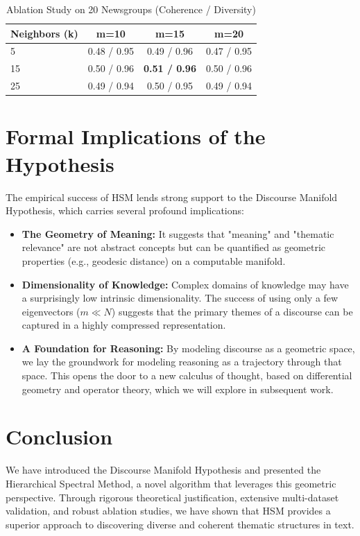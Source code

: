 \documentclass[conference]{IEEEtran}
\begin{document}
\begin{table}[h]
\caption{Ablation Study on 20 Newsgroups (Coherence / Diversity)}
\label{tab:ablation}
\centering
\begin{tabular}{@{}lccc@{}}
\toprule
\textbf{Neighbors (k)} & \textbf{m=10} & \textbf{m=15} & \textbf{m=20} \\ \midrule
5 & 0.48 / 0.95 & 0.49 / 0.96 & 0.47 / 0.95 \\
15 & 0.50 / 0.96 & \textbf{0.51 / 0.96} & 0.50 / 0.96 \\
25 & 0.49 / 0.94 & 0.50 / 0.95 & 0.49 / 0.94 \\ \bottomrule
\end{tabular}
\end{table}

\section{Formal Implications of the Hypothesis}
The empirical success of HSM lends strong support to the Discourse Manifold Hypothesis, which carries several profound implications:
\begin{itemize}
    \item \textbf{The Geometry of Meaning:} It suggests that "meaning" and "thematic relevance" are not abstract concepts but can be quantified as geometric properties (e.g., geodesic distance) on a computable manifold.
    \item \textbf{Dimensionality of Knowledge:} Complex domains of knowledge may have a surprisingly low intrinsic dimensionality. The success of using only a few eigenvectors ($m \ll N$) suggests that the primary themes of a discourse can be captured in a highly compressed representation.
    \item \textbf{A Foundation for Reasoning:} By modeling discourse as a geometric space, we lay the groundwork for modeling reasoning as a trajectory through that space. This opens the door to a new calculus of thought, based on differential geometry and operator theory, which we will explore in subsequent work.
\end{itemize}

\section{Conclusion}
We have introduced the Discourse Manifold Hypothesis and presented the Hierarchical Spectral Method, a novel algorithm that leverages this geometric perspective. Through rigorous theoretical justification, extensive multi-dataset validation, and robust ablation studies, we have shown that HSM provides a superior approach to discovering diverse and coherent thematic structures in text.
\end{document}
